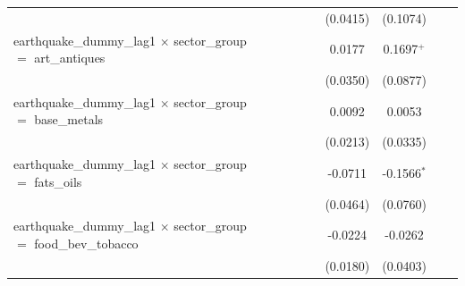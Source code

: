 \begin{tabular}{lcccccccc}
                                                                                  &                       &                       &                       &                       & (0.0415)              & (0.1074)              &                       &   \\   
   earthquake\_dummy\_lag1 $\times$ sector\_group $=$ art\_antiques               &                       &                       &                       &                       & 0.0177                & 0.1697$^{+}$          &                       &   \\   
                                                                                  &                       &                       &                       &                       & (0.0350)              & (0.0877)              &                       &   \\   
   earthquake\_dummy\_lag1 $\times$ sector\_group $=$ base\_metals                &                       &                       &                       &                       & 0.0092                & 0.0053                &                       &   \\   
                                                                                  &                       &                       &                       &                       & (0.0213)              & (0.0335)              &                       &   \\   
   earthquake\_dummy\_lag1 $\times$ sector\_group $=$ fats\_oils                  &                       &                       &                       &                       & -0.0711               & -0.1566$^{*}$         &                       &   \\   
                                                                                  &                       &                       &                       &                       & (0.0464)              & (0.0760)              &                       &   \\   
   earthquake\_dummy\_lag1 $\times$ sector\_group $=$ food\_bev\_tobacco          &                       &                       &                       &                       & -0.0224               & -0.0262               &                       &   \\   
                                                                                  &                       &                       &                       &                       & (0.0180)              & (0.0403)              &                       &   \\   

\end{tabular}
